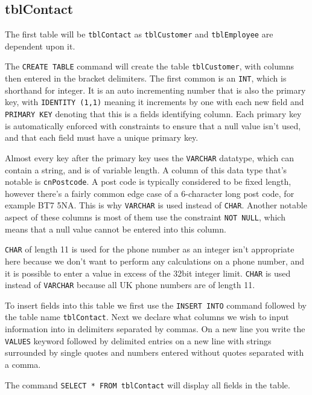 \documentclass[11pt,a4paper]{scrartcl}
\begin{document}
	\subsection{tblContact}\label{tblcontact}
	
	The first table will be \texttt{tblContact} as \texttt{tblCustomer} and \texttt{tblEmployee} are dependent upon it.
	
	
	
	The \texttt{CREATE TABLE} command will create the table \texttt{tblCustomer}, with columns then entered in the bracket delimiters. The first common is an \texttt{INT}, which is shorthand for integer. It is an auto incrementing number that is also the primary key, with \texttt{IDENTITY (1,1)} meaning it increments by one with each new field and \texttt{PRIMARY KEY} denoting that this is a fields identifying column. Each primary key is automatically enforced with constraints to ensure that a null value isn’t used, and that each field must have a unique primary key.
	
	Almost every key after the primary key uses the \texttt{VARCHAR} datatype, which can contain a string, and is of variable length. A column of this data type that’s notable is \texttt{cnPostcode}. A post code is typically considered to be fixed length, however there’s a fairly common edge case of a 6-character long post code, for example BT7 5NA. This is why \texttt{VARCHAR} is used instead of \texttt{CHAR}. Another notable aspect of these columns is most of them use the constraint \texttt{NOT NULL}, which means that a null value cannot be entered into this column.
	
	\texttt{CHAR} of length 11 is used for the phone number as an integer isn’t appropriate here because we don’t want to perform any calculations on a phone number, and it is possible to enter a value in excess of the 32bit integer limit. \texttt{CHAR} is used instead of \texttt{VARCHAR} because all UK phone numbers are of length 11.
	
	To insert fields into this table we first use the \texttt{INSERT INTO} command followed by the table name \texttt{tblContact}. Next we declare what columns we wish to input information into in delimiters separated by commas. On a new line you write the \texttt{VALUES} keyword followed by delimited entries on a new line with strings surrounded by single quotes and numbers entered without quotes separated with a comma.
	
	The command \texttt{SELECT * FROM tblContact} will display all fields in the table.
	
\end{document}
